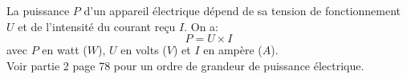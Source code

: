 \begin{mybilan}
	

		La puissance $P$ d'un appareil électrique dépend de sa tension de fonctionnement $U$ et de l'intensité du courant reçu $I$. On a: \pause
		\begin{equation*}
			P = U \times I
		\end{equation*}
	avec $P$ en watt ($W$), $U$ en volts ($V$) et $I$ en ampère ($A$).\\
	
	
	Voir partie 2 page 78 pour un ordre de grandeur de puissance électrique.
		 
\end{mybilan}